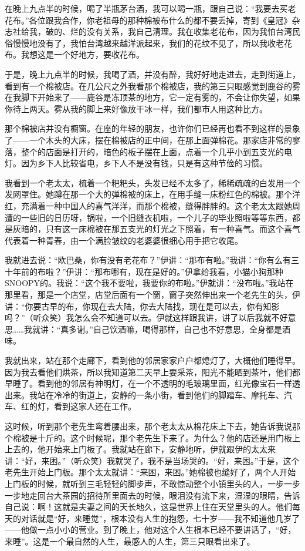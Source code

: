 \par 在晚上九点半的时候，喝了半瓶茅台酒，我可以喝一瓶，跟自己说：“我要去买老花布。”各位跟我合作，你老祖母的那种棉被布什么的都不要丢掉，寄到《皇冠》杂志社给我，破的、烂的没有关系，我自己清理。我在收集老花布，因为我怕台湾民俗慢慢地没有了，我怕台湾越来越洋派起来，我们的花纹不见了，所以我收老花布。我想这是一个好地方，要收花布。
\par 于是，晚上九点半的时候，我喝了酒，并没有醉，我好好地走进去，走到街道上，看到有一个棉被店。在几公尺之外我看那个棉被店，我的第三只眼感觉到鹿谷的雾在我脚下开始来了——鹿谷是冻顶茶的地方，它一定有雾的，不会让你失望，如果你待上两天。雾从我的脚上来好像放干冰一样，我们都市人用这种比方。
\par 那个棉被店并没有橱窗。在座的年轻的朋友，也许你们已经再也看不到这样的景象了——一个木头的大床，摆在棉被店的正中间，在那上面弹棉花。那家店非常的寥落，整个的店面是打开的，暗色的板子摆在上面，点着一个几乎小到五支光的电灯。因为乡下人比较省电，乡下人不是没有钱，只是有这种节俭的习惯。
\par 我看到一个老太太，梳着一个粑粑头，头发已经不太多了，稀稀疏疏的白发用一个发网罩住。她蹲在那一个大的弹棉被的床上，在用手缝一床粉红色的棉被。那个洋红，充满着一种中国人的喜气洋洋，而那个棉被，缝得胖胖的。这个老太太跟她周遭的一些旧的日历呀，锅啦，一个旧缝衣机啦，一个儿子的毕业照啦等等东西，都是灰暗的，只有这一床棉被在那五支光的灯光之下照着，有一种喜气。而这个喜气代表着一种青春，由一个满脸皱纹的老婆婆很细心用手把它收尾。
\par 我就进去说：“欧巴桑，你有没有老花布？”伊讲：“那布有啦。”我讲：“你有么有三十年前的布啦？”伊讲：“那布哪有，现在是好的。”伊拿给我看，小猫小狗那种SNOOPY的。我说：“这个我不要啦，我要你的布啦。”伊就讲：“没布啦。”我站在那里看，那是一个店堂，店堂后面有一个窗，窗子突然伸出来一个老先生的头，伊讲：“你要古早的布，你现在去大陆，你去大陆找，现在是可以去，你有知影吗？”（听众笑）我怎么会不知道可以去。伊就这样跟我讲，讲了以后我就不好意思……我就讲：“真多谢。”自己饮酒嘛，喝得那样，自己也不好意思，全身都是酒味。
\par 我就出来，站在那个走廊下，看到他的邻居家家户户都熄灯了，大概他们睡得早。因为我去看他们烘茶，所以我知道第二天早上要采茶，阳光不能晒到茶叶，他们都早睡了。看到他的邻居有神明灯，在一个不透明的毛玻璃里面，红光像宝石一样透出来。我站在冷冷的街道上，安静的一条小街，看到他们的脚踏车、摩托车、汽车、红的灯，看到这家人还在工作。
\par 这时候，听到那个老先生弯着腰出来，那个老太太从棉花床上下去，她告诉我说那个棉被是十斤的。这个时候呢，那个老先生下来了。为什么？他的店还是用门板上上去的，他开始来上门板了。我就站在廊下，安静地听，伊就跟伊的太太来讲：“好，来困。”（听众笑）我就哭了，我不是当场哭的。“好，来困。”于是，这个老先生开始上门板。那个太太就讲：“来困，来困。”她棉被也缝好了，两个人开始上门板的时候，就听到三毛轻轻的脚步声，不敢惊动整个小镇里头的人，一步一步一步地走回台大茶园的招待所里面去的时候，眼泪没有流下来，湿湿的眼睛，告诉自己说：啊！这就是夫妻之间的天长地久，这是世界上住在天堂里头的人。他们每天的对话就是“好，来睡觉”，根本没有人生的抱怨，七十岁——我不知道他几岁了——他做一点小小的营业。到了晚上，他对这个人生根本已经不要讲话了，“好，来睡”。这是一个最自然的人生，最感人的人生，第三只眼看出来了。
